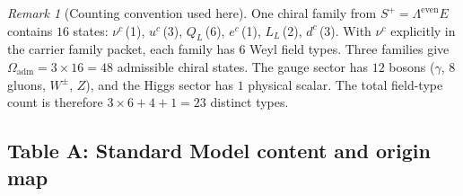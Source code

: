 \documentclass[11pt,a4paper]{article}
\theoremstyle{definition}
\theoremstyle{remark}
\newtheorem*{remark}{Remark}
\newcommand{\Oadm}{\Omega_{\mathrm{adm}}}
\begin{document}
\begin{remark}[Counting convention used here]
\label{rem:counting-convention}
One chiral family from $S^+=\Lambda^{\mathrm{even}}E$ contains $16$ states:
$\nu^c$\,(1), $u^c$\,(3), $Q_L$\,(6), $e^c$\,(1), $L_L$\,(2), $d^c$\,(3).
With $\nu^c$ explicitly in the carrier family packet, each family has $6$ Weyl field types.
Three families give $\Oadm=3\times 16=48$ admissible chiral states.
The gauge sector has $12$ bosons ($\gamma$, $8$ gluons, $W^\pm$, $Z$), and the Higgs sector has
$1$ physical scalar. The total field-type count is therefore $3\times 6+4+1=23$ distinct types.
\end{remark}

\subsection{Table A: Standard Model content and origin map}
\end{document}
